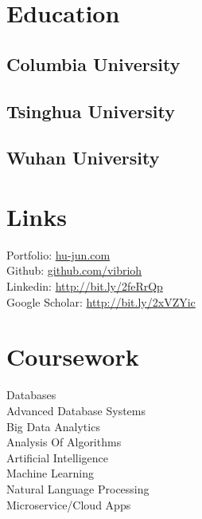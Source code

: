 \documentclass[]{junhu_resume}
\begin{document}
\begin{minipage}[t]{0.33\textwidth} 


\section{Education} 

\subsection{Columbia University}
\sectionsep

\subsection{Tsinghua University}
\sectionsep

\subsection{Wuhan University}
\sectionsep


\section{Links} 
Portfolio: \href{http://www.hu-jun.com}{hu-jun.com}\\
Github: \href{https://github.com/vibrioh}{github.com/vibrioh}\\
Linkedin: \href{https://www.linkedin.com/in/jun-hu-664639a2/}{http://bit.ly/2feRrQp} \\
Google Scholar: \href{https://scholar.google.com/citations?user=Vr8dYJsAAAAJ}{http://bit.ly/2xVZYic}
\sectionsep


\section{Coursework}
Databases\\
Advanced Database Systems\\
Big Data Analytics\\
Analysis Of Algorithms\\
Artificial Intelligence\\
Machine Learning\\
Natural Language Processing\\
Microservice/Cloud Apps
\sectionsep


\end{minipage}
\end{document}
